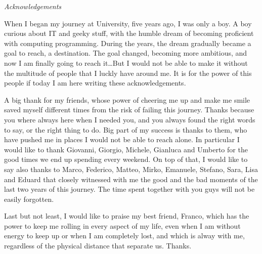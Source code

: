 \cleardoublepage
{}
\thispagestyle{empty}


\begingroup
\let\clearpage\relax
\let\cleardoublepage\relax
\let\cleardoublepage\relax


\noindent \textit{Acknowledgements}\\
\bigskip

\noindent When I began my journey at University, five years ago, I was only
a boy. A boy curious about IT and geeky stuff, with the humble dream of becoming
proficient with computing programming. During the years, the dream gradually
became a goal to reach, a destination. The goal changed, becoming more
ambitious, and now I am finally going to reach it\dots But I would not be able
to make it without the multitude of people that I luckly have around me. It is
for the power of this people if today I am here writing these acknowledgements.

\vspace{0.3cm}

\noindent A big thank for my friends, whose power of cheering me up and make
me smile saved myself different times from the risk of failing this journey.
Thanks because you where always here when I needed you, and you always found the
right words to say, or the right thing to do. Big part of my success is thanks
to them, who have pushed me in places I would not be able to reach alone. In
particular I would like to thank Giovanni, Giorgio, Michele, Gianluca and
Umberto for the good times we end up spending every weekend. On top of that, I
would like to say also thanks to Marco, Federico, Matteo, Mirko, Emanuele,
Stefano, Sara, Lisa and Eduard that closely witnessed with me the good and the
bad moments of the last two years of this journey. The time spent together with
you guys will not be easily forgotten.

\vspace{0.3cm}

\noindent Last but not least, I would like to praise my best friend, Franco,
which has the power to keep me rolling in every aspect of my life, even when I
am without energy to keep up or when I am completely lost, and which is alway
with me, regardless of the physical distance that separate us. Thanks.

